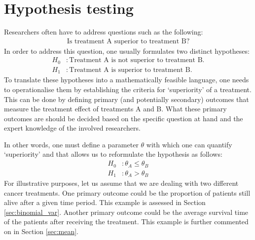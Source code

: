 \section{Hypothesis testing}
Researchers often have to address questions such as the following:
\begin{align*}
    \text{Is treatment A superior to treatment B?} 
\end{align*}
In order to address this question, one usually formulates two distinct hypotheses:
\begin{align*}
    H_0 &: \text{Treatment A is not superior to treatment B}.\\
    H_1 &: \text{Treatment A is superior to treatment B}.
\end{align*}
To translate these hypotheses into a mathematically feasible language, one needs to operationalise them by establishing the criteria for `superiority' of a treatment. This can be done by defining primary (and potentially secondary) outcomes that measure the treatment effect of treatments A and B. What these primary outcomes are should be decided based on the specific question at hand and the expert knowledge of the involved researchers.\par
In other words, one must define a parameter $\theta$ with which one can quantify `superiority' and that allows us to reformulate the hypothesis as follows:
\begin{align*}
    H_0 &: \theta_A \leq \theta_B\\
    H_1 &: \theta_A > \theta_B
\end{align*}
For illustrative purposes, let us assume that we are dealing with two different cancer treatments. One primary outcome could be the proportion of patients still alive after a given time period. This example is assessed in Section \ref{sec:binomial_var}. Another primary outcome could be the average survival time of the patients after receiving the treatment. This example is further commented on in Section \ref{sec:mean}.\par

